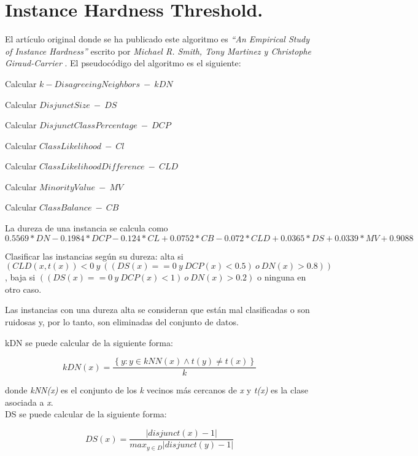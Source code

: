 \section{Instance Hardness Threshold.} \label{sec:alg_ihts}
El artículo original donde se ha publicado este algoritmo es \textit{``An Empirical Study of Instance Hardness''} escrito por \textit{Michael R. Smith, Tony Martinez y Christophe Giraud-Carrier} \cite{ihts}. El pseudocódigo del algoritmo es el siguiente:

\begin{codigo}
\begin{algorithmic}[1]
\State \parbox[t]{305pt}{Calcular $k-Disagreeing Neighbors\ - \ kDN$\strut}
\State \parbox[t]{305pt}{Calcular $Disjunct Size\ - \ DS$\strut}
\State \parbox[t]{305pt}{Calcular $Disjunct Class Percentage\ - \ DCP$\strut}
\State \parbox[t]{305pt}{Calcular $Class Likelihood\ - \ Cl$\strut}
\State \parbox[t]{305pt}{Calcular $Class Likelihood Difference\ - \ CLD$\strut}
\State \parbox[t]{305pt}{Calcular $Minority Value\ - \ MV$\strut}
\State \parbox[t]{305pt}{Calcular $Class Balance\ - \ CB$\strut}
\State \parbox[t]{305pt}{La dureza de una instancia se calcula como $0.5569 * DN - 0.1984 * DCP - 0.124 * CL + 0.0752 * CB - 0.072 * CLD + 0.0365 * DS + 0.0339 * MV + 0.9088$\strut}
\State \parbox[t]{305pt}{Clasificar las instancias según su dureza: alta si $(CLD(x,t(x)) < 0\ y\ ((DS(x) == 0\ y\ DCP(x) < 0.5)\ o\ DN(x) > 0.8))$, baja si $((DS(x) == 0\ y\ DCP(x) < 1)\ o\ DN(x) > 0.2)$ o ninguna en otro caso.\strut}
\State \parbox[t]{305pt}{Las instancias con una dureza alta se consideran que están mal clasificadas o son ruidosas y, por lo tanto, son eliminadas del conjunto de datos.\strut}
\EndFunction 
\end{algorithmic}
\end{codigo}

kDN se puede calcular de la siguiente forma: 

\begin{equation}
	kDN(x) = \frac{\left \{ y:y \in kNN(x) \wedge t(y) \neq t(x) \right \}}{k}
\end{equation}

donde \textit{kNN(x)} es el conjunto de los \textit{k} vecinos más cercanos de \textit{x} y \textit{t(x)} es la clase asociada a \textit{x}. \\

DS se puede calcular de la siguiente forma: 

\begin{equation}
	DS(x) = \frac{\left | disjunct(x) - 1 \right |}{max_{y\in D}\left | disjunct(y) - 1 \right |}
\end{equation}

